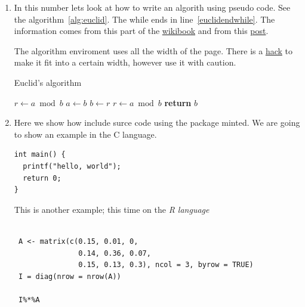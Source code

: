 \begin{enumerate}
\item In this number lets look at how to write an algorith using pseudo code.
See the algorithm~\ref{alg:euclid}. The while ends in line~\ref{euclidendwhile}.
The information comes from this part of the \href{https://en.wikibooks.org/wiki/LaTeX/Algorithms#Typesetting_using_the_algorithmicx_package}{wikibook} and from this \href{https://tex.stackexchange.com/questions/229355/algorithm-algorithmic-algorithmicx-algorithm2e-algpseudocode-confused}{post}.

The algorithm enviroment uses all the width of the page.
There is a \href{https://tex.stackexchange.com/questions/350434/adjust-width-of-algorithm-float}{hack} to make it fit into a certain width, however use it with caution.

{\centering
\begin{minipage}{\linewidth}
  \begin{algorithm}[H]
    \caption{Euclid's algorithm}
    \label{alg:euclid}
    \begin{algorithmic}[1] %
       
        \State $r\gets a \bmod b$
         
          \State $a \gets b$
          \State $b \gets r$
          \State $r \gets a \bmod b$
        \EndWhile\label{euclidendwhile}
        \State \textbf{return} $b$
      \EndProcedure
    \end{algorithmic}
  \end{algorithm}
\end{minipage}
\par
}

\item Here we show how include surce code using the package minted. We are going to show an example in the C language.
\begin{verbatim}
int main() {
  printf("hello, world");
  return 0;
}
\end{verbatim}

This is another example; this time on the \emph{R language}

\begin{verbatim}

 A <- matrix(c(0.15, 0.01, 0,
               0.14, 0.36, 0.07,
               0.15, 0.13, 0.3), ncol = 3, byrow = TRUE)
 I = diag(nrow = nrow(A))

 I%*%A
\end{verbatim}


\end{enumerate}
